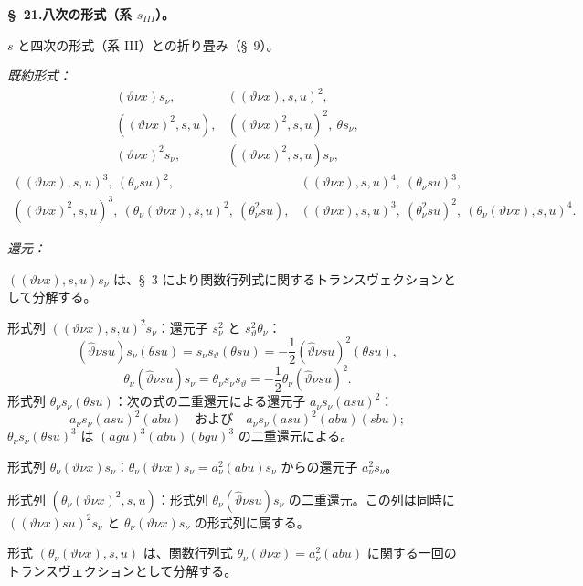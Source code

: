 \documentclass[11pt]{article}
\begin{document}
\begin{center}
\textbf{\S\ 21.\quad 八次の形式（系 $s_{III}$）。}
\end{center}

$s$ と四次の形式（系 III）との折り畳み（\S\ 9）。

\noindent\emph{既約形式：}
\[
\begin{array}{lll}
(\vartheta\nu x)s_\nu,& ((\vartheta\nu x),s,u)^2,\\[-0.1em]
((\vartheta\nu x)^2,s,u),& ((\vartheta\nu x)^2,s,u)^2,\ \theta s_\nu,\\[-0.1em]
(\vartheta\nu x)^2s_\nu,& ((\vartheta\nu x)^2,s,u)s_\nu,
\end{array}
\]
\[
\begin{array}{lll}
((\vartheta\nu x),s,u)^3,\ (\theta_\nu su)^2,&
((\vartheta\nu x),s,u)^4,\ (\theta_\nu su)^3,\\[-0.1em]
((\vartheta\nu x)^2,s,u)^3,\ (\theta_\nu(\vartheta\nu x),s,u)^2,\ (\theta_\nu^2su),&
((\vartheta\nu x),s,u)^3,\ (\theta_\nu^2su)^2,\ (\theta_\nu(\vartheta\nu x),s,u)^4.
\end{array}
\]

\noindent\emph{還元：}

$((\vartheta\nu x),s,u)s_\nu$ は、\S\ 3 により関数行列式に関するトランスヴェクションとして分解する。

形式列 $((\vartheta\nu x),s,u)^2s_\nu$：還元子 $s_\nu^2$ と $s_\vartheta^2\theta_\nu$：
\[
(\widehat\vartheta\nu su)s_\nu(\theta su)=s_\nu s_\vartheta(\theta su)=-\frac12(\widehat\vartheta\nu su)^2(\theta su),
\]
\[
\theta_\nu(\widehat\vartheta\nu su)s_\nu=\theta_\nu s_\nu s_\vartheta=-\frac12\theta_\nu(\widehat\vartheta\nu su)^2.
\]
形式列 $\theta_\nu s_\nu(\theta su)$：次の式の二重還元による還元子 $a_\nu s_\nu(asu)^2$：
\[
a_\nu s_\nu(asu)^2(abu)\quad\text{および}\quad a_\nu s_\nu(asu)^2(abu)(sbu);
\]
$\theta_\nu s_\nu(\theta su)^3$ は $(agu)^3(abu)(bgu)^3$ の二重還元による。

形式列 $\theta_\nu(\vartheta\nu x)s_\nu$：$\theta_\nu(\vartheta\nu x)s_\nu=a_\nu^2(abu)s_\nu$ からの還元子 $a_\nu^2s_\nu$。

形式列 $(\theta_\nu(\vartheta\nu x)^2,s,u)$：形式列 $\theta_\nu(\widehat\vartheta\nu su)s_\nu$ の二重還元。この列は同時に $((\vartheta\nu x)su)^2s_\nu$ と $\theta_\nu(\vartheta\nu x)s_\nu$ の形式列に属する。

形式 $(\theta_\nu(\vartheta\nu x),s,u)$ は、関数行列式 $\theta_\nu(\vartheta\nu x)=a_\nu^2(abu)$ に関する一回のトランスヴェクションとして分解する。
\end{document}
